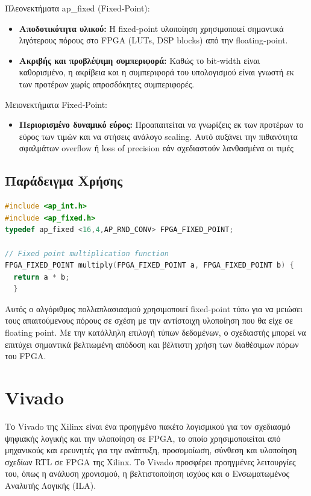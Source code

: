 Πλεονεκτήματα ap\_fixed (Fixed‑Point):
\begin{itemize}
  \item \textbf{Αποδοτικότητα υλικού:} Η fixed‑point υλοποίηση χρησιμοποιεί σημαντικά λιγότερους πόρους στο FPGA (LUTs, DSP blocks) από την floating‑point.
  \item \textbf{Ακριβής και προβλέψιμη συμπεριφορά:} Καθώς το bit‑width είναι καθορισμένο, η ακρίβεια και η συμπεριφορά του υπολογισμού είναι γνωστή εκ των προτέρων χωρίς απροσδόκητες συμπεριφορές.
\end{itemize}

Μειονεκτήματα Fixed‑Point:
\begin{itemize}
  \item \textbf{Περιορισμένο δυναμικό εύρος:} Προαπαιτείται να γνωρίζεις εκ των προτέρων το εύρος των τιμών και να στήσεις ανάλογο scaling. Αυτό αυξάνει την πιθανότητα σφαλμάτων overflow ή loss of precision εάν σχεδιαστούν λανθασμένα οι τιμές
\end{itemize}

\subsection{Παράδειγμα Χρήσης}
\begin{lstlisting}[language=C++, caption={Παράδειγμα χρήσης fixed-point τύπων στο Vitis HLS}]
#include <ap_int.h>
#include <ap_fixed.h>
typedef ap_fixed <16,4,AP_RND_CONV> FPGA_FIXED_POINT;

// Fixed point multiplication function
FPGA_FIXED_POINT multiply(FPGA_FIXED_POINT a, FPGA_FIXED_POINT b) {
  return a * b;
  }
\end{lstlisting}

Αυτός ο αλγόριθμος πολλαπλασιασμού χρησιμοποιεί fixed-point τύπo για να μειώσει τους απαιτούμενους πόρους σε σχέση με την αντίστοιχη υλοποίηση που θα είχε σε floating point.
Με την κατάλληλη επιλογή τύπων δεδομένων, ο σχεδιαστής μπορεί να επιτύχει σημαντικά βελτιωμένη απόδοση και βέλτιστη χρήση των διαθέσιμων πόρων του FPGA.


\section{Vivado}
Το Vivado της Xilinx είναι ένα προηγμένο πακέτο λογισμικού για τον σχεδιασμό ψηφιακής λογικής και την υλοποίηση σε FPGA,
το οποίο χρησιμοποιείται από μηχανικούς και ερευνητές για την ανάπτυξη, προσομοίωση, σύνθεση και υλοποίηση σχεδίων RTL σε FPGA της Xilinx.
Το Vivado προσφέρει προηγμένες λειτουργίες του, όπως η ανάλυση χρονισμού, η βελτιστοποίηση ισχύος και ο Ενσωματωμένος Αναλυτής Λογικής (ILA).

